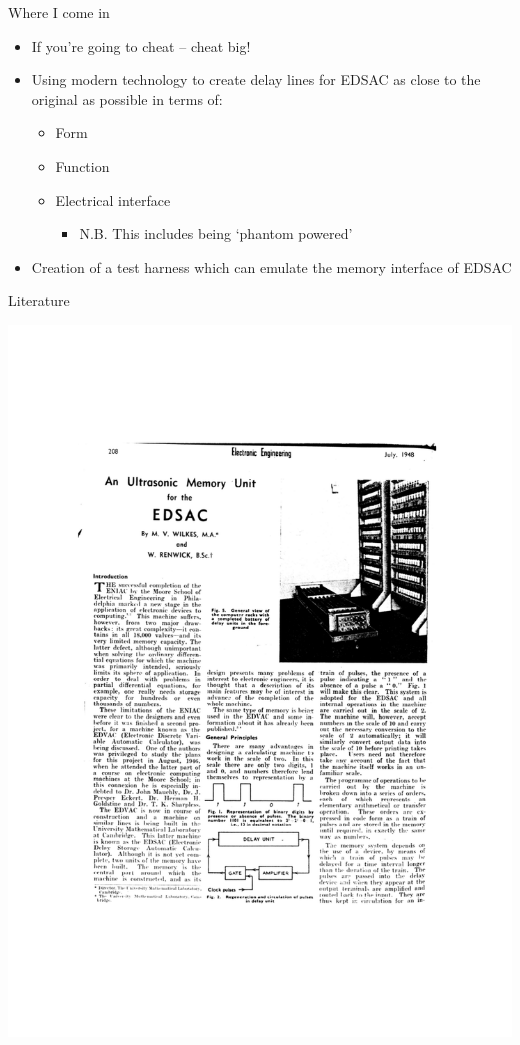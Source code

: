 \documentclass[aspectratio=169,11pt, xcolor={table}]{beamer}
\begin{document}
\begin{frame}{Where I come in}

\begin{itemize}
	\item \alert{If you're going to cheat -- cheat big!}
	
	\item Using modern technology to create delay lines for EDSAC as close to the original as possible in terms of:
	\begin{itemize}
		\item Form
		\item Function
		\item Electrical interface
		\begin{itemize}
			\item N.B. This includes being `phantom powered'
		\end{itemize}
	\end{itemize}
	\item Creation of a test harness which can emulate the memory interface of EDSAC
\end{itemize}
\end{frame}

\begin{frame}{Literature}

	\centering
	\includegraphics[trim={0 9cm 0 0.5cm},clip, height=0.8\textheight]{figs/literature}

\end{frame}
\end{document}
